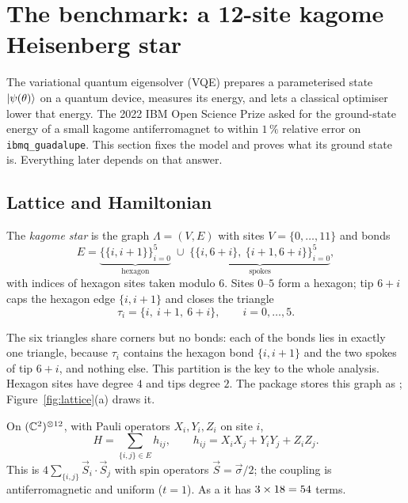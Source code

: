 \section{The benchmark: a 12-site kagome Heisenberg star}
\label{sec:problem}

The variational quantum eigensolver (VQE) \parencite{peruzzo2014} prepares a parameterised
state $\ket{\psi(\theta)}$ on a quantum device, measures its energy, and lets a classical
optimiser lower that energy. The 2022 IBM Open Science Prize \parencite{ibmprize2022} asked for
the ground-state energy of a small kagome antiferromagnet to within $1\,\%$ relative error on
\texttt{ibmq\_guadalupe}. This section fixes the model and proves what its ground state is.
Everything later depends on that answer.

\subsection{Lattice and Hamiltonian}

\begin{dfn}\label{dfn:star}
  The \emph{kagome star} is the graph $\Lambda=(V,E)$ with sites $V=\{0,\dots,11\}$ and
  \VNumBonds{} bonds
  \[
    E=\underbrace{\bigl\{\{i,i+1\}\bigr\}_{i=0}^{5}}_{\text{hexagon}}\;\cup\;
    \underbrace{\bigl\{\{i,6+i\},\ \{i+1,6+i\}\bigr\}_{i=0}^{5}}_{\text{spokes}},
  \]
  with indices of hexagon sites taken modulo $6$. Sites $0$--$5$ form a hexagon; tip $6+i$
  caps the hexagon edge $\{i,i+1\}$ and closes the triangle
  \[
    \tau_i=\{i,\ i+1,\ 6+i\},\qquad i=0,\dots,5 .
  \]
\end{dfn}

The six triangles share corners but no bonds: each of the \VNumBonds{} bonds lies in exactly one
triangle, because $\tau_i$ contains the hexagon bond $\{i,i+1\}$ and the two spokes of tip
$6+i$, and nothing else. This partition is the key to the whole analysis.
Hexagon sites have degree $4$ and tips degree $2$. The package stores this graph as
; Figure~\ref{fig:lattice}(a) draws it.

\begin{dfn}\label{dfn:ham}
  On $(\mathbb{C}^2)^{\otimes 12}$, with Pauli operators $X_i,Y_i,Z_i$ on site $i$,
  \[
    H=\sum_{\{i,j\}\in E} h_{ij},\qquad h_{ij}=X_iX_j+Y_iY_j+Z_iZ_j .
  \]
  This is $4\sum_{\{i,j\}}\vec S_i\cdot\vec S_j$ with spin operators $\vec S=\vec\sigma/2$; the
  coupling is antiferromagnetic and uniform ($t=1$). As a  it has
  $3\times18=54$ terms.
\end{dfn}

